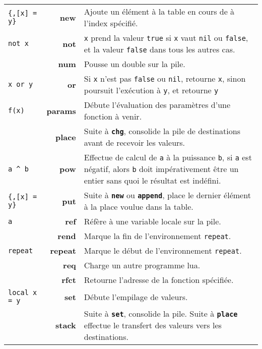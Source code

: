 \documentclass{article}
\begin{document}
\begin{longtable}{p{1.3cm} r p{12cm}}
  {\lstset{style=lua}\lstinline${,[x] = y}$} & \textbf{new} & Ajoute un élément à la table en cours de à l'index spécifié.\\
  {\lstset{style=lua}\lstinline$not x$} & \textbf{not} & \texttt{x} prend la valeur {\lstset{style=lua}\lstinline$true$} si \texttt{x} vaut {\lstset{style=lua}\lstinline$nil$} ou {\lstset{style=lua}\lstinline$false$}, et la valeur {\lstset{style=lua}\lstinline$false$} dans tous les autres cas.\\
  & \textbf{num} & Pousse un double sur la pile.\\
  {\lstinline$x or y$} & \textbf{or} & Si \texttt{x} n'est pas {\lstset{style=lua}\lstinline$false$} ou {\lstset{style=lua}\lstinline$nil$}, retourne \texttt{x}, sinon poursuit l'exécution à \texttt{y}, et retourne \texttt{y}\\
  {\lstset{style=lua}\lstinline$f(x)$} & \textbf{params} & Débute l'évaluation des paramètres d'une fonction à venir.\\
  & \textbf{place} & Suite à \texttt{\textbf{chg}}, consolide la pile de destinations avant de recevoir les valeurs.\\
  {\lstinline$a ^ b$} & \textbf{pow} & Effectue de calcul de \texttt{a} à la puissance \texttt{b}, si \texttt{a} est négatif, alors \texttt{b} doit impérativement être un entier sans quoi le résultat est indéfini.\\
  {\lstset{style=lua}\lstinline${,[x] = y}$} & \textbf{put} & Suite à \texttt{\textbf{new}} ou \texttt{\textbf{append}}, place le dernier élément à la place voulue dans la table.\\
  {\lstset{style=lua}\lstinline$a$} & \textbf{ref} & Réfère à une variable locale sur la pile.\\
   & \textbf{rend} & Marque la fin de l'environnement {\lstset{style=lua}\lstinline$repeat$}.\\
  {\lstset{style=lua}\lstinline$repeat$} & \textbf{repeat} & Marque le début de l'environnement {\lstset{style=lua}\lstinline$repeat$}.\\
   & \textbf{req} & Charge un autre programme lua.\\
  & \textbf{rfct} & Retourne l'adresse de la fonction spécifiée.\\
  {\lstset{style=lua}\lstinline$local x = y$} & \textbf{set} & Débute l'empilage de valeurs.\\
  & \textbf{stack} & Suite à \texttt{\textbf{set}}, consolide la pile. Suite à \texttt{\textbf{place}} effectue le transfert des valeurs vers les destinations.\\

\end{longtable}
\end{document}
